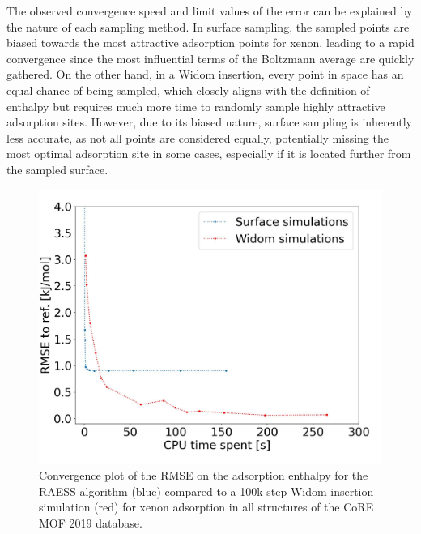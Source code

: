 \documentclass[main]{subfiles}
\begin{document}
The observed convergence speed and limit values of the error can be explained by the nature of each sampling method. In surface sampling, the sampled points are biased towards the most attractive adsorption points for xenon, leading to a rapid convergence since the most influential terms of the Boltzmann average are quickly gathered. On the other hand, in a Widom insertion, every point in space has an equal chance of being sampled, which closely aligns with the definition of enthalpy but requires much more time to randomly sample highly attractive adsorption sites. However, due to its biased nature, surface sampling is inherently less accurate, as not all points are considered equally, potentially missing the most optimal adsorption site in some cases, especially if it is located further from the sampled surface.

\begin{figure}[ht]
  \centering
    \includegraphics[width=0.7\linewidth]{figures/3-fastsim/time_rmse.jpeg}
    \caption{Convergence plot of the RMSE on the adsorption enthalpy for the RAESS algorithm (blue) compared to a 100k-step Widom insertion simulation (red) for xenon adsorption in {all} structures of the CoRE MOF 2019 database.}\label{fgr:convergence}
  \end{figure}
  
\end{document}
